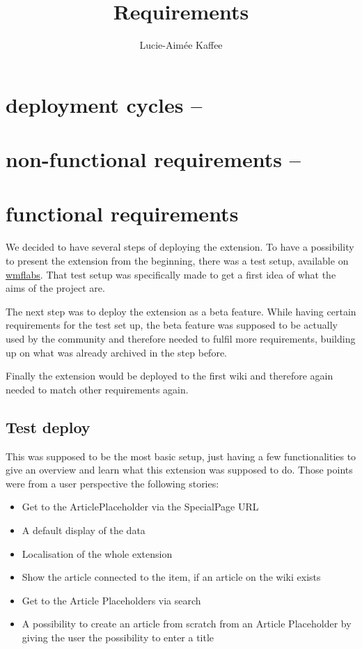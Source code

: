 \documentclass[11pt]{article}
\title {{Requirements}}
\author {Lucie-Aim\'{e}e Kaffee}
\date{}
\begin{document}
\maketitle

\section{deployment cycles --}
\section{non-functional requirements --}
\section{functional requirements}

We decided to have several steps of deploying the extension. 
To have a possibility to present the extension from the beginning, there was a test setup, available on \href{articleplaceholder.wmflabs.org/mediawiki}{wmflabs}. That test setup was specifically made to get a first idea of what the aims of the project are. 

The next step was to deploy the extension as a beta feature. While having certain requirements for the test set up, the beta feature was supposed to be actually used by the community and therefore needed to fulfil more requirements, building up on what was already archived in the step before.

Finally the extension would be deployed to the first wiki and therefore again needed to match other requirements again. 

\subsection{Test deploy}

This was supposed to be the most basic setup, just having a few functionalities to give an overview and learn what this extension was supposed to do. 
Those points were from a user perspective the following stories:
\begin{itemize}
\item Get to the ArticlePlaceholder via the SpecialPage URL
\item A default display of the data
\item Localisation of the whole extension
\item Show the article connected to the item, if an article on the wiki exists
\item Get to the Article Placeholders via search
\item A possibility to create an article from scratch from an Article Placeholder by giving the user the possibility to enter a title
\end{itemize}
\end{document}
